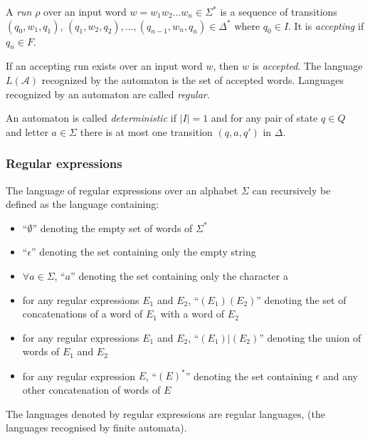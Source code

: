 \documentclass[12px]{article}
\begin{document}
        A \textit{run} $\rho$ over an input word $w= w_1 w_2 \ldots w_n \in
        \Sigma^*$ is a sequence of transitions $(q_0, w_1, q_1)$, $(q_1, w_2,
        q_2), \ldots, (q_{n-1}, w_n, q_n) \in \Delta^*$ where $q_0 \in I$. It
        is \textit{accepting} if $q_n \in F$.

        If an accepting run exists over an input word $w$, then $w$ is
        \textit{accepted}. The language $L(\mathcal{A})$ recognized by the
        automaton is the set of accepted words. Languages recognized by an
        automaton are called \textit{regular}.

        An automaton is called \textit{deterministic} if $|I| = 1$ and for any
        pair of state $q \in Q$ and letter $a \in \Sigma$ there is at most one
        transition $(q, a, q')$ in $\Delta$.

      \subsubsection{Regular expressions}%
        \label{sec:def:regex}

        The language of regular expressions over an alphabet $\Sigma$ can
        recursively be defined as the language containing:
          \begin{itemize}
            \item ``$\emptyset$'' denoting the empty set of words of $\Sigma^*$
            \item ``$\epsilon$'' denoting the set containing only the empty
              string
            \item $\forall a \in \Sigma$, ``$a$'' denoting the set containing
              only the character a
            \item for any regular expressions $E_1$ and $E_2$, ``$(E_1) (E_2)$''
              denoting the set of concatenations of a word of $E_1$ with a word
              of $E_2$
            \item for any regular expressions $E_1$ and $E_2$,
              ``$(E_1)|(E_2)$'' denoting the union of words of $E_1$ and $E_2$
            \item for any regular expression $E$, ``${(E)}^*$'' denoting the
              set containing $\epsilon$ and any other concatenation of words of
              $E$
          \end{itemize}

        The languages denoted by regular expressions are regular languages,
        (the languages recognised by finite automata).
\end{document}
